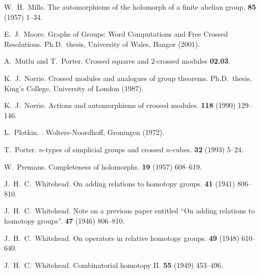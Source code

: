 \begin{thebibliography}{notes}
W.~H.~Mills.
\newblock The automorphisms of the holomorph of a finite abelian group.
 {\bf 85} (1957) 1--34.

E.~J.~Moore.
\newblock Graphs of Groups: Word Computations and Free Crossed Resolutions.
\newblock Ph.{D}.~thesis, University of Wales, Bangor (2001).

A.~Mutlu and T.~Porter.
\newblock Crossed squares and $2$-crossed modules {\bf 02.03}.

K.~J.~Norrie.
\newblock Crossed modules and analogues of group theorems.
\newblock Ph.{D}.~thesis, King's College, University of London (1987).

K.~J.~Norrie.
\newblock Actions and automorphisms of crossed modules.
 {\bf 118} (1990) 129--146.

L.~Plotkin.
.
\newblock Wolters-Noordhoff, Groningen (1972).

T.~Porter.
\newblock $n$-types of simplicial groups and crossed $n$-cubes.
 {\bf 32} (1993) 5--24.

W.~Premans.
\newblock Completeness of holomorphs.
 {\bf 19} (1957) 608--619.

J.~H.~C.~Whitehead.
\newblock On adding relations to homotopy groups.
 {\bf 41} (1941) 806--810.

J.~H.~C.~Whitehead.
\newblock Note on a previous paper entitled ``On adding relations to homotopy
  groups''.
 {\bf 47} (1946) 806--810.

J.~H.~C.~Whitehead.
\newblock On operators in relative homotopy groups.
 {\bf 49} (1948) 610--640.

J.~H.~C.~Whitehead.
\newblock Combinatorial homotopy {I}{I}.
 {\bf 55} (1949) 453--496.

\end{thebibliography}

 

